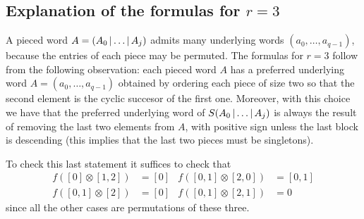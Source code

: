 \subsection{Explanation of the formulas for \texorpdfstring{$r=3$}{r = 3}} A pieced word $A = (A_0\operatorname{|}\ldots\operatorname{|} A_j)$ admits many underlying words $(a_0,\ldots,a_{q-1})$, because the entries of each piece may be permuted. The formulas for $r=3$ follow from the following observation: each pieced word $A$ has a preferred underlying word $A = (a_0,\ldots,a_{q-1})$ obtained by ordering each piece of size two so that the second element is the cyclic succesor of the first one. Moreover, with this choice we have that the preferred underlying word of $S(A_0\operatorname{|}\ldots\operatorname{|} A_{j})$ is always the result of removing the last two elements from $A$, with positive sign unless the last block is descending (this implies that the last two pieces must be singletons). 

To check this last statement it suffices to check that
\begin{align*}
	f([0]\otimes [1,2]) &= [0]
	&
	f([0,1]\otimes [2,0]) &= [0,1]
	\\
		f([0,1]\otimes [2]) &= [0]
	&
	f([0,1]\otimes [2,1]) &= 0
\end{align*}
since all the other cases are permutations of these three. 






